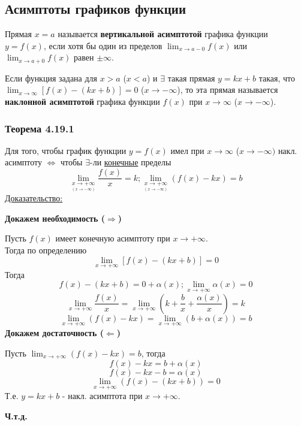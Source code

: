\documentclass[12pt]{article}
\begin{document}
    \subsection{Асимптоты графиков функции}
    \noindent Прямая $x = a$ называется \textbf{вертикальной асимптотой} графика функции $y = f(x)$, если хотя бы один из пределов $\lim_{x\to a-0} f(x)$ или $\lim_{x\to a + 0} f(x)$ равен $\pm \infty$.\par\noindent
    Если функция задана для $x > a$ ($x < a$) и $\exists$ такая прямая $y = kx+b$ такая, что $\lim_{x \to \infty} [ f(x) - (kx+b) ] = 0$ ($x \to -\infty$), то эта прямая называется \textbf{наклонной асимптотой} графика функции $f(x)$ при $x \to \infty$ ($x \to -\infty$).
    
    \subsubsection*{Теорема 4.19.1}\label{th:4.19.1}
    Для того, чтобы график функции $y = f(x)$ имел при $x \to \infty$ ($x \to -\infty)$ накл. асимптоту $\Leftrightarrow$ чтобы $\exists$-ли \underline{конечные} пределы
    \[ \lim_{\underset{(x \to -\infty)}{x\to +\infty}} \frac{f(x)}{x} = k; \lim_{\underset{(x \to -\infty)}{x\to +\infty}} (f(x) - kx) = b \]
    \underline{Доказательство:}
    \begin{adjustwidth}{1.5em}{1.5em}
        \textbf{Докажем необходимость ($\Rightarrow$)}\par\noindent
        Пусть $f(x)$ имеет конечную асимптоту при $x \to +\infty$.\\
        Тогда по определению
        \[ \lim_{x\to +\infty} [ f(x) - (kx+b) ] = 0 \]
        Тогда
        \[ f(x) - (kx+b) = 0 + \alpha(x); \lim_{x \to +\infty} \alpha(x) = 0 \]
        \[ \lim_{x \to +\infty}\frac{f(x)}{x} = \lim_{x\to +\infty} (k + \frac{b}{x} + \frac{\alpha(x)}{x}) = k \]
        \[ \lim_{x \to +\infty} (f(x) - kx) = \lim_{x \to +\infty}(b + \alpha(x)) = b \]
        \textbf{Докажем достаточность ($\Leftarrow$)}\par\noindent
        Пусть $\lim_{x\to +\infty} (f(x) - kx) = b$, тогда 
        \[f(x) - kx = b + \alpha(x)\]
        \[f(x) - kx - b = \alpha(x)\]
        \[ \lim_{x\to +\infty} (f(x) - (kx+b)) = 0 \]
        Т.е. $y = kx+b$ - накл. асимптота при $x \to +\infty$.

        \begin{center}
            \textbf{Ч.т.д.}
        \end{center}
    \end{adjustwidth} 
    
\end{document}
